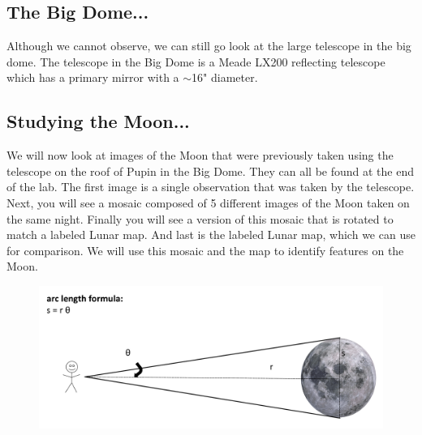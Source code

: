 \documentclass[12pt]{article}%
\begin{document}
\vspace{4cm}


\subsection*{The Big Dome...}
Although we cannot observe, we can still go look at the large telescope in the big dome. The telescope in the Big Dome is a Meade LX200 reflecting telescope which has a primary mirror with a $\sim$16" diameter.

\subsection*{Studying the Moon...}
We will now look at images of the Moon that were previously taken using the telescope on the roof of Pupin in the Big Dome. They can all be found at the end of the lab. The first image is a single observation that was taken by the telescope. Next, you will see a mosaic composed of 5 different images of the Moon taken on the same night. Finally you will see a version of this mosaic that is rotated to match a labeled Lunar map. And last is the labeled Lunar map, which we can use for comparison. We will use this mosaic and the map to identify features on the Moon.

\begin{figure}[htb!]
\center
\includegraphics[width=15cm]{arc_length.pdf}
\end{figure}
\end{document}

